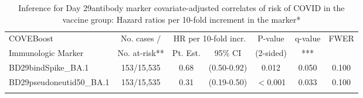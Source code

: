 \begin{longtable}{lcccccc}
\caption{Inference for Day 29antibody marker covariate-adjusted correlates of risk of COVID in the vaccine group: Hazard ratios per 10-fold increment in the marker*} \\ 
   \hline
 
         \multicolumn{1}{l}{COVEBoost} & \multicolumn{1}{c}{No. cases /}   & \multicolumn{2}{c}{HR per 10-fold incr.}                     & \multicolumn{1}{c}{P-value}   & \multicolumn{1}{c}{q-value}   & \multicolumn{1}{c}{FWER} \\ 
         \multicolumn{1}{l}{Immunologic Marker}            & \multicolumn{1}{c}{No. at-risk**} & \multicolumn{1}{c}{Pt. Est.} & \multicolumn{1}{c}{95\% CI} & \multicolumn{1}{c}{(2-sided)} & \multicolumn{1}{c}{***} & \multicolumn{1}{c}{} \\ 
         \hline
 
    BD29bindSpike\_BA.1 & 153/15,535 & 0.68 & (0.50-0.92) & 0.012 & 0.050 & 0.100 \\ 
  BD29pseudoneutid50\_BA.1 & 153/15,535 & 0.31 & (0.19-0.50) & $<$0.001 & 0.033 & 0.100 \\ 
   \hline
\hline
\label{tab:CoR_univariable_svycoxph_pretty}
\end{longtable}
